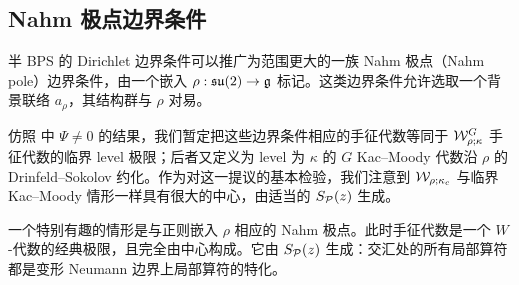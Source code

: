 %

\subsection{Nahm 极点边界条件}\label{nbc}

半 BPS 的 Dirichlet 边界条件可以推广为范围更大的一族 Nahm 极点（Nahm pole）边界条件，由一个嵌入 $\rho:\mathfrak{su}(2)\to{\mathfrak g}$ 标记。这类边界条件允许选取一个背景联络 $a_\rho$，其结构群与 $\rho$ 对易。

仿照 \cite{Gaiotto:2017euk} 中 $\Psi \neq 0$ 的结果，我们暂定把这些边界条件相应的手征代数等同于 ${\cal W}^G_{\rho;\kappa}$ 手征代数的临界 level 极限；后者又定义为 level 为 $\kappa$ 的 $G$ Kac–Moody 代数沿 $\rho$ 的 Drinfeld–Sokolov 约化。作为对这一提议的基本检验，我们注意到 ${\cal W}_{\rho;\kappa_c}$ 与临界 Kac–Moody 情形一样具有很大的中心，由适当的 $S_{\cal P}(z)$ 生成。

一个特别有趣的情形是与正则嵌入 $\rho$ 相应的 Nahm 极点。此时手征代数是一个 $W$-代数的经典极限，且完全由中心构成。它由 $S_{\cal P}(z)$ 生成：交汇处的所有局部算符都是变形 Neumann 边界上局部算符的特化。

